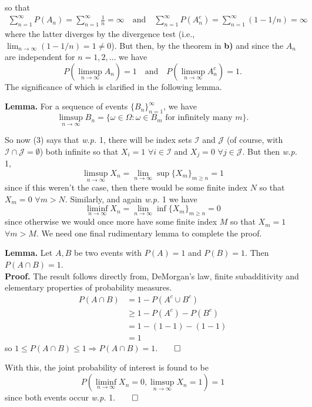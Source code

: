\documentclass[11pt, letterpaper]{article}
\newcommand{\mc}[1]{\mathcal{#1}}
\begin{document}
    so that
    \begin{align*}
        \sum_{n=1}^\infty P(A_n)=\sum_{n=1}^\infty\frac{1}{n}=\infty\quad\text{and}\quad\sum_{n=1}^\infty P(A_n^c)=\sum_{n=1}^\infty(1-1/n)=\infty
    \end{align*}
    where the latter diverges by the divergence test (i.e., $\lim_{n\rightarrow\infty}(1-1/n)=1\neq0$). But then, by the theorem in {\bf b)} and since the $A_n$ are independent for $n=1,2,\dots$ we have
    \[P(\limsup_{n\rightarrow\infty}A_n)=1\quad\text{and}\quad P(\limsup_{n\rightarrow\infty}A_n^c)=1.\tag{3}\]
    The significance of which is clarified in the following lemma.\\[3pt]
    \begin{center}
        \begin{minipage}[c]{0.85\linewidth}
            {\bf Lemma.} For a sequence of events $\{B_n\}_{n=1}^\infty$, we have
            \[\limsup_{n\rightarrow\infty}B_n=\{\omega\in\Omega:\omega\in B_m\text{ for infinitely many $m$}\}.\]
        \end{minipage}
    \end{center}\vspace{10pt}
    So now (3) says that {{\it w.p.}} 1, there will be index sets $\mc{I}$ and $\mc{J}$ (of course, with $\mc{I}\cap\mc{J}=\emptyset$) both infinite so that
    $X_i=1$ $\forall i\in\mc{I}$ and $X_j=0$ $\forall j\in\mc{J}$. But then {\it w.p.} 1,
    \[\limsup_{n\rightarrow\infty}X_n=\lim_{n\rightarrow\infty}\sup\{X_m\}_{m\geq n}=1\]
    since if this weren't the case, then there would be some finite index $N$ so that $X_m=0$ $\forall m>N$. Similarly, and again {\it w.p.} 1 we have
    \[\liminf_{n\rightarrow\infty}X_n=\lim_{n\rightarrow\infty}\inf\{X_m\}_{m\geq n}=0\]
    since otherwise we would once more have some finite index $M$ so that $X_m=1$ $\forall m>M$. We need one final rudimentary lemma to complete the proof.\\[3pt]
    \begin{center}
        \begin{minipage}[c]{0.85\linewidth}
            {\bf Lemma.} Let $A,B$ be two events with $P(A)=1$ and $P(B)=1$. Then $P(A\cap B)=1$.\\[10pt]
            {\bf Proof.} The result follows directly from, DeMorgan's law, finite subadditivity and elementary properties of probability measures.
            \begin{align*}
                P(A\cap B)&=1-P(A^c\cup B^c)\tag{DeMorgan's law}\\
                &\geq1-P(A^c)-P(B^c)\tag{finite subadditivity}\\
                &=1-(1-1)-(1-1)\\
                &=1
            \end{align*}
            so $1\leq P(A\cap B)\leq 1\Rightarrow P(A\cap B)=1$.\hfill{$\qed$}
        \end{minipage}\vspace{10pt}
    \end{center}
    With this, the joint probability of interest is found to be
    \[P(\liminf_{n\rightarrow\infty}X_n=0,\limsup_{n\rightarrow\infty}X_n=1)=1\]
    since both events occur {\it w.p.} 1.\hfill{$\qed$}
    
\end{document}
